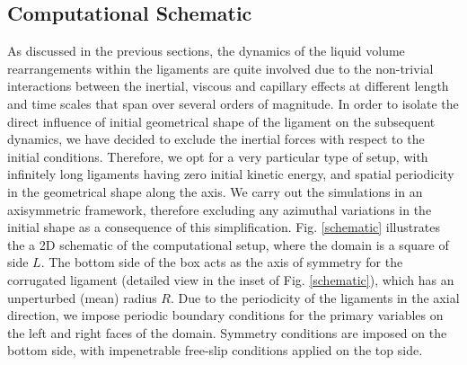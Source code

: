 \subsection*{Computational Schematic}

As discussed in the previous sections, the 
dynamics of the liquid volume rearrangements 
within the ligaments are quite involved 
due to the non-trivial interactions between
the inertial, viscous and capillary effects 
at different length and time scales that span
over several orders of magnitude.
In order to isolate the direct influence of 
initial geometrical shape of the ligament on 
the subsequent dynamics, we have decided to 
exclude the inertial forces 
with respect to the initial conditions. 
Therefore, we opt for a very particular type of setup,
with infinitely long ligaments having zero initial kinetic energy, 
and spatial periodicity in the geometrical shape along the axis. 
We carry out the simulations in an axisymmetric framework, 
therefore excluding any azimuthal variations
in the initial shape as a consequence of this simplification. 
Fig. \ref{schematic} illustrates the a 2D schematic of the
computational setup, where the domain is a square of side $L$. 
The bottom side of the box acts as the axis of symmetry for 
the corrugated ligament (detailed view in the inset of Fig. \ref{schematic}), 
which has an unperturbed (mean) radius $R$. 
Due to the periodicity of the ligaments in the axial direction, 
we impose periodic boundary conditions for the primary variables 
on the left and right faces of the domain.
Symmetry conditions are imposed on the bottom side, 
with impenetrable free-slip conditions applied on the top side. 


